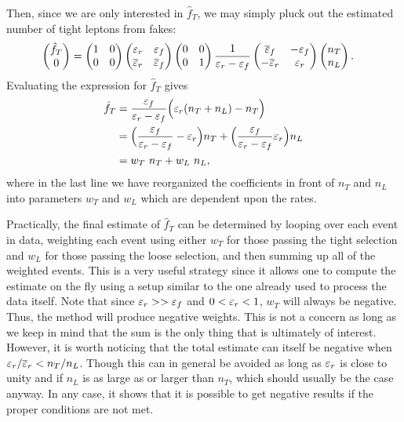 Then,  since we are only interested in $\hat{f}_T$, 
we may simply pluck out the estimated number of tight leptons
from fakes:
\begin{align}
  \label{eq:mxm_final_single2}
  \begin{pmatrix} \hat{f}_T \\ 0 \end{pmatrix} 
  &=
  \begin{pmatrix}
  1 & 0\\ 0 & 0
  \end{pmatrix} 
  \begin{pmatrix}
  \varepsilon_r & \varepsilon_f \\ \overline{\varepsilon}_r & \overline{\varepsilon}_f
  \end{pmatrix} 
  \begin{pmatrix}
  0 & 0\\ 0 & 1
  \end{pmatrix} 
  \frac{1}{\varepsilon_r-\varepsilon_f}
  \begin{pmatrix}
  \overline{\varepsilon}_f & -\varepsilon_f \\ -\overline{\varepsilon}_r& \varepsilon_r
  \end{pmatrix} 
  \begin{pmatrix} n_T\\ n_L \end{pmatrix}.
\end{align}
Evaluating the expression for $\hat{f}_T$ gives
\begin{align}
\hat{f}_T &= \frac{\varepsilon_f}{\varepsilon_r-\varepsilon_f} \Big( \varepsilon_r(n_T+n_L) - n_T \Big)  \\
           &= \Big( \frac{\varepsilon_f}{\varepsilon_r-\varepsilon_f} 
	      -\varepsilon_r\Big) n_T 
	      + \Big(\frac{\varepsilon_f}{\varepsilon_r-\varepsilon_f} \varepsilon_r \Big)n_L\\
           &= w_T~n_T + w_L~n_L,
\end{align}
where in the last line we have reorganized the coefficients in front
of $n_T$ and $n_L$ into parameters $w_T$ and $w_L$ which are dependent
upon the rates. 

Practically, the final estimate of $\hat{f}_T$
can be determined by looping over each event in data, weighting each event
using either $w_T$ for those passing the tight selection and
$w_L$ for those passing the loose selection, and then 
summing up all of the weighted events.  This is a very useful 
strategy since it allows one to compute the estimate on the fly
using a setup similar to the one already used to process the data itself. %
Note that since $\varepsilon_r>>\varepsilon_f$ and $0<\varepsilon_r<1$,
$w_T$ will always be negative. Thus, the method will produce negative weights.
This is not a concern as long as we keep in mind that the sum
is the only thing that is ultimately of interest.
However, it is worth noticing that the total estimate can itself
be negative when 
$\varepsilon_r / \overline{\varepsilon}_r < n_T/n_L$.
Though this can in general be avoided as long as $\varepsilon_r$
is close to unity and if $n_L$ is
as large as or larger than $n_T$, which should usually be the case
anyway. In any case, it shows that it is possible to get negative
results if the proper conditions are not met.

